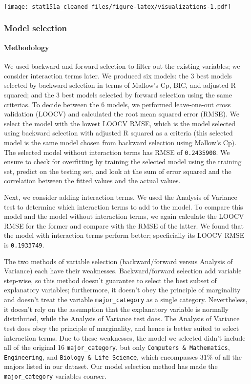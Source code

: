 \documentclass[
]{article}
\begin{document}
\texttt{[image: stat151a\_cleaned\_files/figure-latex/visualizations-1.pdf]}

\hypertarget{model-selection}{%
\subsubsection{Model selection}\label{model-selection}}

\hypertarget{methodology}{%
\paragraph{Methodology}\label{methodology}}

We used backward and forward selection to filter out the existing
variables; we consider interaction terms later. We produced six models:
the 3 best models selected by backward selection in terms of Mallow's
Cp, BIC, and adjusted R squared; and the 3 best models selected by
forward selection using the same criterias. To decide between the 6
models, we performed leave-one-out cross validation (LOOCV) and
calculated the root mean squared error (RMSE). We select the model with
the lowest LOOCV RMSE, which is the model selected using backward
selection with adjusted R squared as a criteria (this selected model is
the same model chosen from backward selection using Mallow's Cp). The
selected model without interaction terms has RMSE of \texttt{0.2435908}.
We ensure to check for overfitting by training the selected model using
the training set, predict on the testing set, and look at the sum of
error squared and the correlation between the fitted values and the
actual values.

Next, we consider adding interaction terms. We used the Analysis of
Variance test to determine which interaction terms to add to the model.
To compare this model and the model without interaction terms, we again
calculate the LOOCV RMSE for the former and compare with the RMSE of the
latter. We found that the model with interaction terms perform better;
specficially its LOOCV RMSE is \texttt{0.1933749}.

The two methods of variable selection (backward/forward versus Analysis
of Variance) each have their weaknesses. Backward/forward selection add
variable step-wise, so this method doesn't guarantee to select the best
subset of explanatory variables; furthermore, it doesn't obey the
principle of marginality and doesn't treat the variable
\texttt{major\_category} as a single category. Nevertheless, it doesn't
rely on the assumption that the explanatory variable is normally
distributed, while the Analysis of Variance test does. The Analysis of
Variance test does obey the principle of marginality, and hence is
better suited to select interaction terms. Due to these weaknesses, the
model we selected didn't include all of the original 16
\texttt{major\_category}, but only \texttt{Computers\ \&\ Mathematics},
\texttt{Engineering}, and \texttt{Biology\ \&\ Life\ Science}, which
encompasses 31\% of all the majors listed in our dataset. Our model
selection method has made the \texttt{major\_category} variables
coarser.
\end{document}
